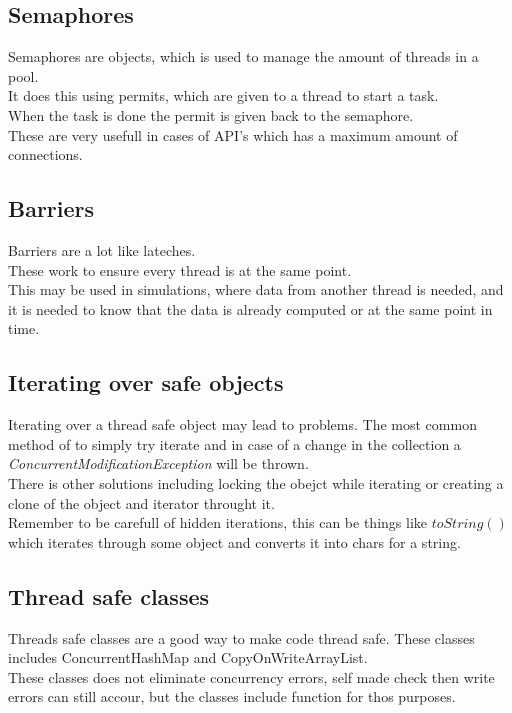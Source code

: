 \documentclass[12pt, a4paper]{article}
\begin{document}
		\subsection{Semaphores}
			Semaphores are objects, which is used to manage the amount of threads in a pool.\\
			It does this using permits, which are given to a thread to start a task.\\
			When the task is done the permit is given back to the semaphore.\\
			These are very usefull in cases of API's which has a maximum amount of connections.
		\subsection{Barriers}
			Barriers are a lot like lateches.\\
			These work to ensure every thread is at the same point.\\
			This may be used in simulations, where data from another thread is needed, and it is needed to know that the data is already computed or at the same point in time.
		\subsection{Iterating over safe objects}
			Iterating over a thread safe object may lead to problems. The most common method of to simply try iterate and in case of a change in the collection a \textit{ConcurrentModificationException} will be thrown.\\
			There is other solutions including locking the obejct while iterating or creating a clone of the object and iterator throught it.\\
			Remember to be carefull of hidden iterations, this can be things like $toString()$ which iterates through some object and converts it into chars for a string.
		\subsection{Thread safe classes}
			Threads safe classes are a good way to make code thread safe. These classes includes ConcurrentHashMap and CopyOnWriteArrayList.\\
			These classes does not eliminate concurrency errors, self made check then write errors can still accour, but the classes include function for thos purposes.
\end{document}
